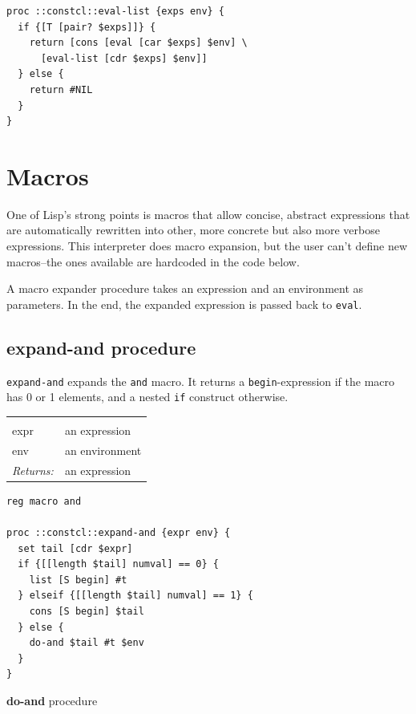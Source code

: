 \documentclass[twoside]{report}
\begin{document}
\begin{lstlisting}
proc ::constcl::eval-list {exps env} {
  if {[T [pair? $exps]]} {
    return [cons [eval [car $exps] $env] \
      [eval-list [cdr $exps] $env]]
  } else {
    return #NIL
  }
}
\end{lstlisting}

\section{Macros}
\label{macros}

One of Lisp's strong points is macros that allow concise, abstract expressions that are automatically rewritten into other, more concrete but also more verbose expressions. This interpreter does macro expansion, but the user can't define new macros--the ones available are hardcoded in the code below.

A macro expander procedure takes an expression and an environment as parameters. In the end, the expanded expression is passed back to \texttt{eval}.

\subsection{expand-and procedure}
\label{expandand-procedure}

\texttt{expand-and} expands the \texttt{and} macro. It returns a \texttt{begin}-expression if the macro has 0 or 1 elements, and a nested \texttt{if} construct otherwise.

\noindent\begin{tabular}{ |p{1.9cm} p{8cm}| }
\hline
\rowcolor[HTML]{CCCCCC} \multicolumn{2}{|l|}{\bf expand-and (internal)} \\
expr & an expression \\
env & an environment \\
\textit{Returns:} & an expression \\
\hline
\end{tabular}

\begin{lstlisting}
reg macro and

proc ::constcl::expand-and {expr env} {
  set tail [cdr $expr]
  if {[[length $tail] numval] == 0} {
    list [S begin] #t
  } elseif {[[length $tail] numval] == 1} {
    cons [S begin] $tail
  } else {
    do-and $tail #t $env
  }
}
\end{lstlisting}

\textbf{do-and} procedure
\end{document}
